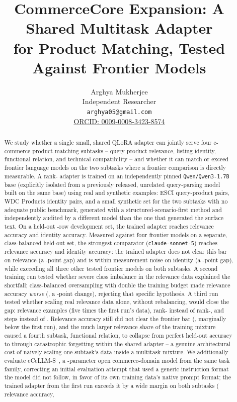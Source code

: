 \documentclass{article}
\title{CommerceCore Expansion: A Shared Multitask Adapter\\for Product Matching, Tested Against Frontier Models}
\author{Arghya Mukherjee\\Independent Researcher\\\texttt{arghya05@gmail.com}\\\href{https://orcid.org/0009-0008-3423-8574}{ORCID: 0009-0008-3423-8574}}
\newcommand{\code}[1]{\texttt{#1}}
\begin{document}
\maketitle

\begin{abstract}
We study whether a single small, shared QLoRA adapter can jointly serve four e-commerce product-matching subtasks -- query-product relevance, listing identity, functional relation, and technical compatibility -- and whether it can match or exceed frontier language models on the two subtasks where a frontier comparison is directly measurable. A rank-\LoraRank{} adapter is trained on an independently pinned \code{Qwen/Qwen3-1.7B} base (explicitly isolated from a previously released, unrelated query-parsing model built on the same base) using \TrainingMixtureRows{} real and synthetic examples: \EsciExamples{} ESCI query-product pairs, \WdcTrainPairs{} WDC Products identity pairs, and a small synthetic set for the two subtasks with no adequate public benchmark, generated with a structured-scenario-first method and independently audited by a different model than the one that generated the surface text. On a held-out \DevSetRows{}-row development set, the trained adapter reaches \AdapterOneRelevanceAcc{} relevance accuracy and \AdapterOneIdentityAcc{} identity accuracy. Measured against four frontier models on a separate, class-balanced held-out set, the strongest comparator (\code{claude-sonnet-5}) reaches \SonnetRelevanceAcc{} relevance accuracy and \SonnetIdentityAcc{} identity accuracy: the trained adapter does not clear this bar on relevance (a \RelevanceGapVsSonnet{}-point gap) and is within measurement noise on identity (a \IdentityGapVsSonnet{}-point gap), while exceeding all three other tested frontier models on both subtasks. A second training run tested whether severe class imbalance in the relevance data explained the shortfall; class-balanced oversampling with double the training budget made relevance accuracy \emph{worse} (\AdapterTwoRelevanceAcc{}, a \AdapterTwoRelevanceDelta{}-point change), rejecting that specific hypothesis. A third run tested whether scaling real relevance data alone, without rebalancing, would close the gap: \AdapterThreeRelevanceRows{} relevance examples (five times the first run's data), rank-\AdapterThreeLoraRank{} instead of rank-\LoraRank{}, and \AdapterThreeTrainSteps{} steps instead of \TrainSteps{}. Relevance accuracy still did not clear the frontier bar (\AdapterThreeRelevanceAcc{}, marginally below the first run), and the much larger relevance share of the training mixture caused a fourth subtask, functional relation, to collapse from perfect held-out accuracy to \AdapterThreeFunctionalAcc{} through catastrophic forgetting within the shared adapter -- a genuine architectural cost of naively scaling one subtask's data inside a multitask mixture. We additionally evaluate eCeLLM-S~\cite{ecellm}, a \EcellmParams{}-parameter open commerce-domain model from the same task family, correcting an initial evaluation attempt that used a generic instruction format the model did not follow, in favor of its own training data's native prompt format; the trained adapter from the first run exceeds it by a wide margin on both subtasks (\EcellmRelevanceAcc{} relevance accuracy, 
\end{abstract}
\end{document}
